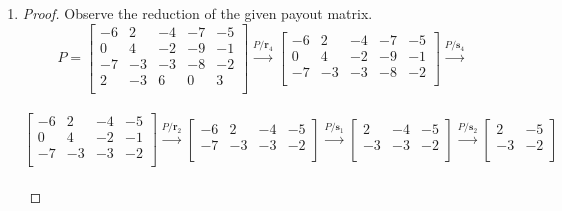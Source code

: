 \documentclass[12pt,oneside]{amsart}
\numberwithin{equation}{section}
\numberwithin{figure}{section}
\theoremstyle{plain}
\theoremstyle{definition}
\begin{document}
\begin{enumerate}
  \item \begin{proof}
    Observe the reduction of the given payout matrix. \\
    \[P = \begin{bmatrix}
      -6 & 2  & -4 & -7 & -5 \\
      0  & 4  & -2 & -9 & -1 \\
      -7 & -3 & -3 & -8 & -2 \\
      2  & -3 & 6  & 0  & 3  \\
    \end{bmatrix} \overset{P/\mathbf{r}_4}{\longrightarrow} \begin{bmatrix}
      -6 & 2  & -4 & -7 & -5 \\
      0  & 4  & -2 & -9 & -1 \\
      -7 & -3 & -3 & -8 & -2 \\
    \end{bmatrix} \overset{P/\mathbf{s}_4}{\longrightarrow}\] \\ 
    \[\begin{bmatrix}
      -6 & 2  & -4 & -5 \\
      0  & 4  & -2 & -1 \\
      -7 & -3 & -3 & -2 \\
    \end{bmatrix} \overset{P/\mathbf{r}_2}{\longrightarrow} \begin{bmatrix}
      -6 & 2  & -4 & -5 \\
      -7 & -3 & -3 & -2 \\
    \end{bmatrix} \overset{P/\mathbf{s}_1}{\longrightarrow} \begin{bmatrix}
      2  & -4 & -5 \\
      -3 & -3 & -2 \\
    \end{bmatrix} \overset{P/\mathbf{s}_2}{\longrightarrow} \begin{bmatrix}
      2  & -5 \\
      -3 & -2 \\
    \end{bmatrix}\] \\
    \end{proof}
\end{enumerate}
\end{document}
